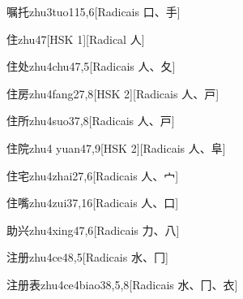 \begin{entry}{嘱托}{zhu3tuo1}{15,6}[Radicais ⼝、⼿]
\end{entry}

\begin{entry}{住}{zhu4}{7}[HSK 1][Radical ⼈]
\end{entry}

\begin{entry}{住处}{zhu4chu4}{7,5}[Radicais ⼈、⼡]
\end{entry}

\begin{entry}{住房}{zhu4fang2}{7,8}[HSK 2][Radicais ⼈、⼾]
\end{entry}

\begin{entry}{住所}{zhu4suo3}{7,8}[Radicais ⼈、⼾]
\end{entry}

\begin{entry}{住院}{zhu4 yuan4}{7,9}[HSK 2][Radicais ⼈、⾩]
\end{entry}

\begin{entry}{住宅}{zhu4zhai2}{7,6}[Radicais ⼈、⼧]
\end{entry}

\begin{entry}{住嘴}{zhu4zui3}{7,16}[Radicais ⼈、⼝]
\end{entry}

\begin{entry}{助兴}{zhu4xing4}{7,6}[Radicais ⼒、⼋]
\end{entry}

\begin{entry}{注册}{zhu4ce4}{8,5}[Radicais ⽔、⼌]
\end{entry}

\begin{entry}{注册表}{zhu4ce4biao3}{8,5,8}[Radicais ⽔、⼌、⾐]
\end{entry}

